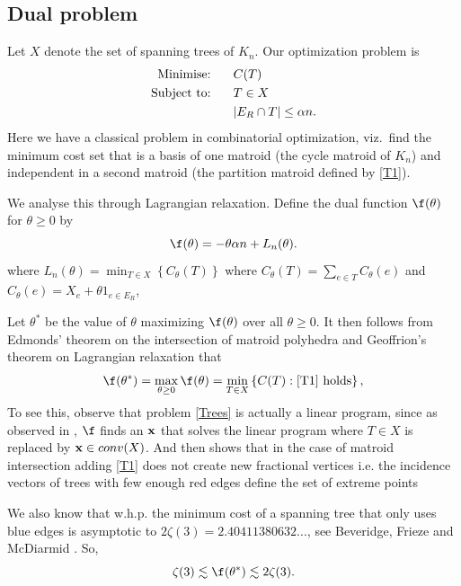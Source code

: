 \documentclass[12pt]{article}
\newcommand{\1}{\textbf{1}}
\def\nn{\nonumber}
\def\a{\alpha} \def\b{\beta} \def\d{\delta} \def\D{\Delta}
\def\z{\zeta} \def\th{\theta} \def\TH{\Theta} \def\Th{\Theta}  \def\l{\lambda}
\def\bx{{\bf x}}
\newcommand{\set}[1]{\left\{#1\right\}}
\newcommand{\beq}[2]{\begin{equation}\label{#1}#2\end{equation}}
\def\nn{\nonumber}
\begin{document}
\subsection{Dual problem}
Let $X$ denote the set of spanning trees of $K_n$. Our optimization problem is
\begin{align}
\text{Minimise:}&\hspace{0.25in} C(T)\label{Trees}\\
\text{Subject to:}&\hspace{0.25in} T\in X\nn\\
&\hspace{0.25in}|E_R\cap T|\leq {\a n}.\label{T1}
\end{align}
Here we have a classical problem in combinatorial optimization, viz.~find the minimum cost set that is a basis of one matroid (the cycle matroid of $K_n$) and independent in a second matroid (the partition matroid defined by \eqref{T1}).

We analyse this through Lagrangian relaxation. Define the dual function $\f(\th)$ for $\th\geq 0$ by
\beq{Lagrange}{
\f(\th)=-\th\a n+L_n(\th).
}
where $L_n(\th)=\min_{T\in X}\set{C_\th(T)}$ where $C_\th(T)=\sum_{e\in  {T}}C_\th(e)$ and $C_{\th}(e)=X_e+\th1_{e\in E_R}$,

Let $\th^*$ be the value of $\th$ maximizing $\f(\th)$ over all $\th \ge 0$. It then follows from Edmonds' theorem \cite{E1} on the intersection of matroid polyhedra and Geoffrion's theorem on Lagrangian relaxation \cite{Ge} that
\[
\f(\th^*)=\max_{\th\geq 0}\f(\th)=\min_{T\in X}\set{ {C(T):\eqref{T1}\text{ holds}}},
\]
To see this, observe that problem \eqref{Trees} is actually a linear program, since as observed in \cite{Ge}, $\f$ finds an $\bx$ that solves the linear program where $T\in X$ is replaced by $\bx\in conv(X)$. And then \cite{E1} shows that in the case of matroid intersection adding \eqref{T1} does not create new fractional vertices i.e. the incidence vectors of trees with few enough red edges define the set of extreme points

We also know that w.h.p. the minimum cost of a spanning tree that only uses blue edges is asymptotic to $2\z(3)= 2.40411380632...$, see Beveridge, Frieze and McDiarmid \cite{BFM}. So, 
\beq{bounds}{
\z(3)\lesssim \f(\th^*)\lesssim 2\z(3).
}
\end{document}
